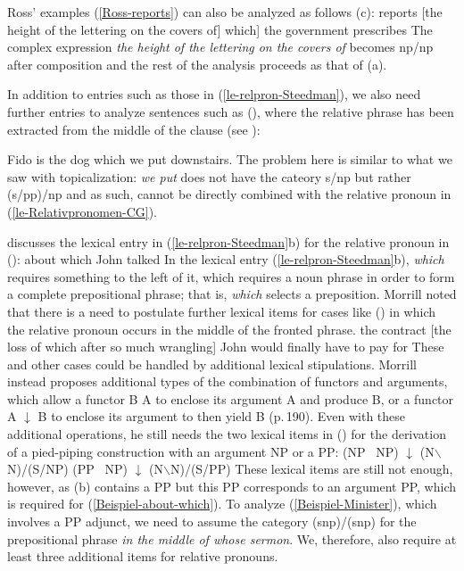 Ross' examples (\ref{Ross-reports}) can also be analyzed as follows (c):
\ea
reports [the height of the lettering on the covers of]
which] the government prescribes
\z
The complex expression \emph{the height of the lettering on the covers of} becomes np/np after composition and the rest of the analysis
proceeds as that of (a).

In addition to entries such as those in (\ref{le-relpron-Steedman}), we also need further entries to
analyze sentences such as (), where the relative phrase has been extracted from the middle of
the clause (see \citealp[]{Pollard88a}):

\ea
Fido is the dog which we put downstairs.
\z
The problem here is similar to what we saw with topicalization: \emph{we put} does not have the cateory
s/np but rather (s/pp)/np and as such, cannot be directly combined with the relative pronoun in (\ref{le-Relativpronomen-CG}).

\citet[]{Morrill95a} discusses the lexical entry in (\ref{le-relpron-Steedman}b) for the relative pronoun in ():
\ea
\label{Beispiel-about-which}
about which John talked
\z
In the lexical entry (\ref{le-relpron-Steedman}b), \emph{which} requires something to the left of it, which requires a noun phrase in order to form a complete
prepositional phrase; that is, \emph{which} selects a preposition. Morrill noted that there is a need
to postulate further lexical items for cases like () in which the relative pronoun occurs in the middle of the fronted phrase.
\ea
the contract [the loss of which after so much wrangling] John would finally have to pay for
\z
These and other cases could be handled by additional lexical stipulations. Morrill instead proposes additional types of the combination of functors and
arguments, which allow a functor B \up\is{$\uparrow$} A to enclose its argument A and produce B, or a functor A $\downarrow$\is{$\downarrow$}
B to enclose its argument to then yield B (p.\,190). Even with these additional operations, he still needs the two lexical items in ()
for the derivation of a pied-piping construction with an argument NP or a PP:
\eal
\ex (NP \up\ NP) $\downarrow$ (N$\backslash$N)/(S/NP)
\ex (PP \up\ NP) $\downarrow$ (N$\backslash$N)/(S/PP)
\zl
These lexical items are still not enough, however, as (b) contains a PP but this PP corresponds to an argument PP, which is required
for (\ref{Beispiel-about-which}). To analyze (\ref{Beispiel-Minister}), which involves a PP adjunct, we need to assume the category (s\bs np)/(s\bs np)  for the prepositional
phrase \emph{in the middle of whose sermon}. We, therefore, also require at least three additional items for relative pronouns.

